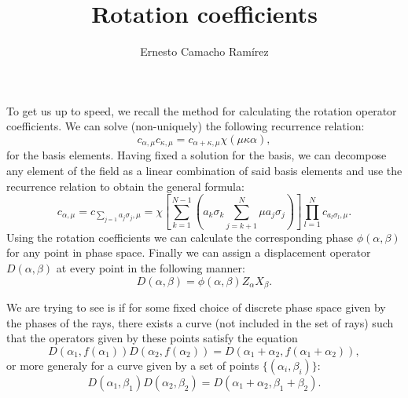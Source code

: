 \documentclass[a4paper]{article}
\title{Rotation coefficients}
\author{Ernesto Camacho Ramírez}
\begin{document}
  \maketitle

  To get us up to speed, we recall the method for
  calculating the rotation operator coefficients. We can
  solve (non-uniquely) the following recurrence relation:
  \begin{equation}
    c_{\alpha,\mu} c_{\kappa,\mu}
    = c_{\alpha+\kappa,\mu} \chi(\mu\kappa\alpha),
  \end{equation}
  for the basis elements. Having fixed a solution for the
  basis, we can decompose any element of the field as a
  linear combination of said basis elements and use the
  recurrence relation to obtain the general formula:
  \begin{equation}
    c_{\alpha,\mu}
    = c_{\sum_{j=1}^{} a_j \sigma_j,\mu}
    = \chi\left[
    \sum_{k=1}^{N-1} \left(
      a_k \sigma_k
      \sum_{j=k+1}^{N} \mu a_j \sigma_j
    \right) \right]
    \prod_{l=1}^N c_{a_l \sigma_l, \mu}.
  \end{equation}
  Using the rotation coefficients we can calculate the
  corresponding phase $\phi(\alpha,\beta)$ for any point in
  phase space. Finally we can assign a displacement operator
  $D(\alpha,\beta)$ at every point in the following manner:
  \begin{equation}
    D(\alpha,\beta)
    = \phi(\alpha,\beta) Z_\alpha X_\beta.
  \end{equation}

  We are trying to see is if for some fixed choice of discrete
  phase space given by the phases of the rays, there exists
  a curve (not included in the set of rays) such that the
  operators given by these points satisfy the equation
  \begin{equation}
    D(\alpha_1,f(\alpha_1)) D(\alpha_2,f(\alpha_2))
    = D(\alpha_1+\alpha_2, f(\alpha_1+\alpha_2)),
  \end{equation}
  or more generaly for a curve given by a set of points
  $\{(\alpha_i,\beta_i)\}$:
  \begin{equation}
    \label{eqn:prop}
    D(\alpha_1,\beta_1) D(\alpha_2,\beta_2)
    = D(\alpha_1+\alpha_2, \beta_1+\beta_2).
  \end{equation}
  
\end{document}
